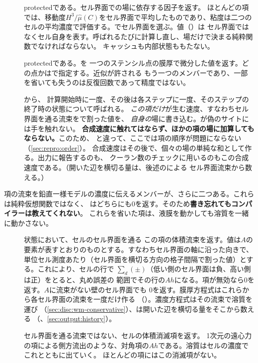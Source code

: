 \begin{description}
  \item[] protectedである。セル界面での場に依存する因子を返す。
    ほとんどの項では、移動度$H^{3}/\hat\mu(C)$をセル界面で平均したものであり、粘度は二つの
    セルの平均濃度で評価する。でセル界面を選ぶ。値（）は
    セル界面ではなくセル自身を表す。呼ばれるたびに計算し直し、場だけで決まる純粋関数でなければならない。
    キャッシュも内部状態ももたない。

  \item[] protectedである。を
    一つのステンシル点の膜厚で微分した値を返す。どの点かはで指定する。近似が許される
    もう一つのメンバーであり、一部を省いても失うのは反復回数であって精度ではない。

  \item[] から、
    計算開始時に一度、その後は各ステップに一度、そのステップの終了時の状態について呼ばれる。
    \emph{この項だけ}が生む速度、すなわちセル界面を通る流束をで割った値を、
    \emph{自身の}場に書き込む。が偽のサイトには手を触れない。
    \textbf{合成速度に触れてはならず、ほかの項の場に加算してもならない。}このため、
    と違って、ここでは項の順序が問題にならない（\cref{sec:repro:order}）。
    合成速度はその後で、個々の場の単純な和として作る。出力に報告するのも、
    クーラン数のチェックに用いるのもこの合成速度である。（開いた辺を横切る量は、後述のによる
    セル界面流束から数える。）

\end{description}

項の流束を鉛直一様モデルの濃度に伝えるメンバーが、さらに二つある。これらは純粋仮想関数ではなく、
はどちらにも0を返す。そのため\textbf{書き忘れてもコンパイラーは教えてくれない}。
これらを省いた項は、液膜を動かしても溶質を一緒に動かさない。

\begin{description}
  \item[] 状態において、セルのセル界面を通る
    この項の体積流束を返す。値は$A$の要素が表すとおりのものとする。すなわちセル界面の軸に沿った向きで、
    単位セル測度あたり（セル界面を横切る方向の格子間隔で割った値）とする。これにより、セルの行で
    $\sum_d (\pm)$（低い側のセル界面は負、高い側は正）をとると、丸め誤差の
    範囲でその行の$A h$になる。項が無効なら0を返す。$A$に流束がない壁のセル界面でも
    0を返す。膜厚方程式はこれらから各セル界面の流束を一度だけ作る
    （）。濃度方程式はその流束で溶質を運び
    （\cref{sec:disc:wm-conservative}）、は開いた辺を横切る量をそこから数える
    （、\cref{sec:output:history}）。
  \item[] セル界面を通る流束ではない、セルの体積消滅項を返す。
    1次元の遠心力の項による側方流出のような、対角項の$A h$である。溶質はセルの濃度でこれとともに出ていく。
    ほとんどの項にはこの消滅項がない。
\end{description}

